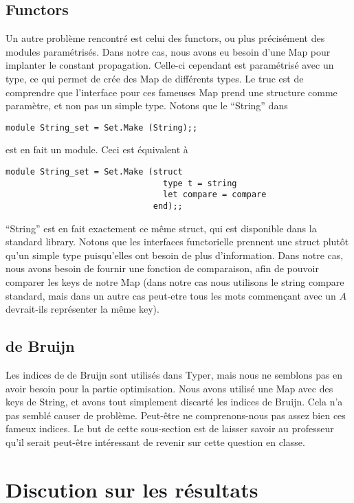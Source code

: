 \documentclass{article}
\begin{document}
\subsection{Functors}

Un autre problème rencontré est celui des functors, ou plus précisément des modules paramétrisés. Dans notre cas, nous avons eu besoin d'une Map pour implanter le constant propagation. Celle-ci cependant est paramétrisé avec un type, ce qui permet de crée des Map de différents types. Le truc est de comprendre que l'interface pour ces fameuses Map prend une structure comme paramètre, et non pas un simple type. Notons que le ``String'' dans
\begin{verbatim}
module String_set = Set.Make (String);;
\end{verbatim}
est en fait un module. Ceci est équivalent à
\begin{verbatim}
module String_set = Set.Make (struct
                                type t = string
                                let compare = compare
                              end);;
\end{verbatim}
``String'' est en fait exactement ce même struct, qui est disponible dans la standard library. Notons que les interfaces functorielle prennent une struct plutôt qu'un simple type puisqu'elles ont besoin de plus d'information. Dans notre cas, nous avons besoin de fournir une fonction de comparaison, afin de pouvoir comparer les keys de notre Map (dans notre cas nous utilisons le string compare standard, mais dans un autre cas peut-etre tous les mots commençant avec un $A$ devrait-ils représenter la même key).

\subsection{de Bruijn}

Les indices de de Bruijn sont utilisés dans Typer, mais nous ne semblons pas en avoir besoin pour la partie optimisation. Nous avons utilisé une Map avec des keys de String, et avons tout simplement discarté les indices de Bruijn. Cela n'a pas semblé causer de problème. Peut-être ne comprenons-nous pas assez bien ces fameux indices. Le but de cette sous-section est de laisser savoir au professeur qu'il serait peut-être intéressant de revenir sur cette question en classe.

\section{Discution sur les résultats}
\end{document}
